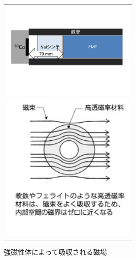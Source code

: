 \begin{figure}[tbp]
  \begin{center}
    \begin{tabular}{c}
      \begin{minipage}[tbp]{0.6\hsize}    
        \begin{center}
          \includegraphics[width=6.5cm]{fig/iguchi/PMTinFe.pdf}
	\caption{鉄管内部図}
	\label{PMTinFe}
     \end{center}
    \end{minipage}
      \begin{minipage}[tbp]{0.4\hsize}    
        \begin{center}
          \includegraphics[width=6.5cm]{fig/iguchi/jibakyusyu.jpg}
         \caption{強磁性体によって吸収される磁場\cite{jibashield}}
	  \label{jibakyusyu}
         \end{center}
        \end{minipage}
     
     \end{tabular}
      \end{center}
   \end{figure}

